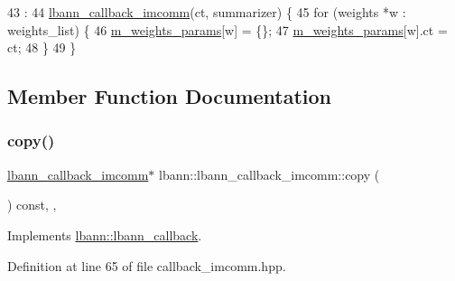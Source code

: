 \begin{DoxyCode}
43                                :
44   \hyperlink{classlbann_1_1lbann__callback__imcomm_a06dc9efdcd77c9e1cf714ecf709a6e3a}{lbann\_callback\_imcomm}(ct, summarizer) \{
45   \textcolor{keywordflow}{for} (weights *w : weights\_list) \{
46     \hyperlink{classlbann_1_1lbann__callback__imcomm_a32a0319c91aff324cb3468de4f31dd50}{m\_weights\_params}[w] = \{\};
47     \hyperlink{classlbann_1_1lbann__callback__imcomm_a32a0319c91aff324cb3468de4f31dd50}{m\_weights\_params}[w].ct = ct;
48   \}
49 \}
\end{DoxyCode}


\subsection{Member Function Documentation}
\mbox{\label{classlbann_1_1lbann__callback__imcomm_a9d59535b4789389a8c3c9e406cd1e2d3}} 
\subsubsection{\texorpdfstring{copy()}{copy()}}
{\footnotesize\ttfamily \hyperlink{classlbann_1_1lbann__callback__imcomm}{lbann\+\_\+callback\+\_\+imcomm}$\ast$ lbann\+::lbann\+\_\+callback\+\_\+imcomm\+::copy (\begin{DoxyParamCaption}{ }\end{DoxyParamCaption}) const\hspace{0.3cm}{\ttfamily [inline]}, {\ttfamily [override]}, {\ttfamily [virtual]}}



Implements \hyperlink{classlbann_1_1lbann__callback_a9f545d1269a8c7af335625d049691f26}{lbann\+::lbann\+\_\+callback}.



Definition at line 65 of file callback\+\_\+imcomm.\+hpp.


